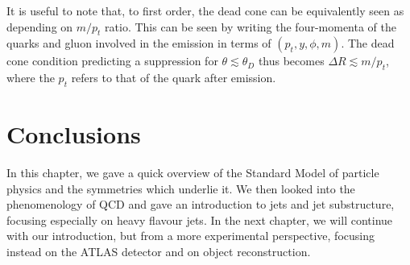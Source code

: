 \documentclass[10pt,a4paper]{book}
\begin{document}
It is useful to note that, to first order, the dead cone can be equivalently seen as depending on $m/p_t$ ratio. This can be seen by writing the four-momenta of the quarks and gluon involved in the emission in terms of $(p_t, y, \phi, m)$. The dead cone condition predicting a suppression for $\theta \lesssim \theta_D$ thus becomes $\Delta R \lesssim m/p_t$, where the $p_t$ refers to that of the quark after emission.

\section*{Conclusions}
In this chapter, we gave a quick overview of the Standard Model of particle physics and the symmetries which underlie it. We then looked into the phenomenology of QCD and gave an introduction to jets and jet substructure, focusing especially on heavy flavour jets. In the next chapter, we will continue with our introduction, but from a more experimental perspective, focusing instead on the ATLAS detector and on object reconstruction.
\end{document}
